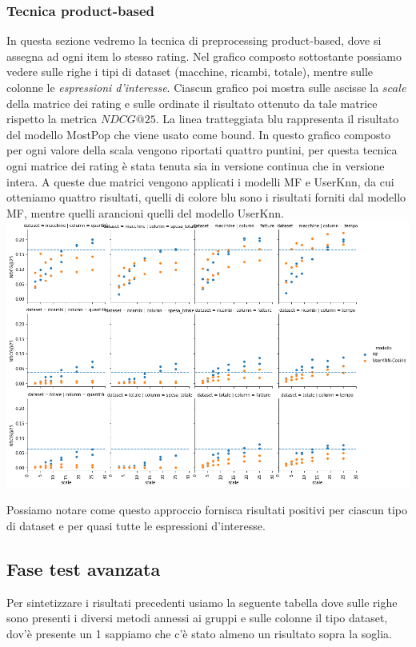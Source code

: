
\subsubsection{Tecnica product-based}
In questa sezione vedremo la tecnica di preprocessing product-based, dove si assegna ad ogni item lo stesso rating.
Nel grafico composto sottostante possiamo vedere sulle righe i tipi di dataset (macchine, ricambi, totale), mentre sulle colonne le \textit{espressioni d'interesse}. Ciascun grafico poi mostra sulle ascisse la $scale$ della matrice dei rating e sulle ordinate il risultato ottenuto da tale matrice rispetto la metrica $NDCG@25$. 
La linea tratteggiata blu rappresenta il risultato del modello MostPop che viene usato come bound.
In questo grafico composto per ogni valore della scala vengono riportati quattro puntini, per questa tecnica ogni matrice dei rating è stata tenuta sia in versione continua che in versione intera. A queste due matrici vengono applicati i modelli MF e UserKnn, da cui otteniamo quattro risultati, quelli di colore blu sono i risultati forniti dal modello MF, mentre quelli arancioni quelli del modello UserKnn.\\

\includegraphics[width=16cm]{figures/prodotto.png}

Possiamo notare come questo approccio fornisca risultati positivi per ciascun tipo di dataset e per quasi tutte le espressioni d'interesse.

\subsection{Fase test avanzata}
Per sintetizzare i risultati precedenti usiamo la seguente tabella dove sulle righe sono presenti i diversi metodi annessi ai gruppi e sulle colonne il tipo dataset, dov'è presente un 1 sappiamo che c'è stato almeno un risultato sopra la soglia.\\

